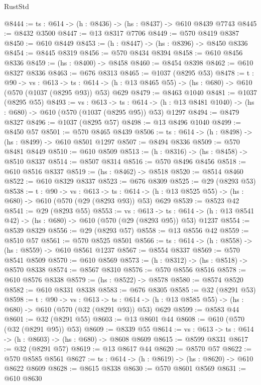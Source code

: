 \begin{lexlean}{RustStd}
\begin{coremodule}
@8444 := {ts : @614} -> (h : @8436) -> (hs : @8437) -> @610 @8439 @7743
@8445 := @8432 @3500
@8447 := @13 @8317 @7706
@8449 := @570 @8419 @8387
@8450 := @610 @8449
@8453 := (h : @8447) -> (hs : @8396) -> @8450 @8336
@8454 := @8445 @8319
@8456 := @570 @8434 @8394
@8458 := @610 @8456 @8336
@8459 := (hs : @8400) -> @8458
@8460 := @8454 @8398
@8462 := @610 @8327 @8336
@8463 := @676 @8313
@8465 := @1037 (@8295 @53)
@8478 := {t : @90} ->
  {vs : @613} ->
  {ts : @614} -> (h : @13 @8465 @55) -> (hs : @680) -> @610 (@570 (@1037 (@8295 @93)) @53) @629
@8479 := @8463 @1040
@8481 := @1037 (@8295 @55)
@8493 := {vs : @613} ->
  {ts : @614} -> (h : @13 @8481 @1040) -> (hs : @680) -> @610 (@570 (@1037 (@8295 @95)) @53) @1297
@8494 := @8479 @8327
@8496 := @1037 (@8295 @57)
@8498 := @13 @8496 @1040
@8499 := @8450 @57
@8501 := @570 @8465 @8439
@8506 := {ts : @614} -> (h : @8498) -> (hs : @8499) -> @610 @8501 @1297
@8507 := @8494 @8336
@8509 := @570 @8481 @8449
@8510 := @610 @8509
@8513 := (h : @8316) -> (hs : @8458) -> @8510 @8337
@8514 := @8507 @8314
@8516 := @570 @8496 @8456
@8518 := @610 @8516 @8337
@8519 := (hs : @8462) -> @8518
@8520 := @8514 @8460
@8522 := @610 @8329 @8337
@8523 := @676 @8309
@8525 := @29 (@8293 @53)
@8538 := {t : @90} ->
  {vs : @613} ->
  {ts : @614} -> (h : @13 @8525 @55) -> (hs : @680) -> @610 (@570 (@29 (@8293 @93)) @53) @629
@8539 := @8523 @42
@8541 := @29 (@8293 @55)
@8553 := {vs : @613} ->
  {ts : @614} -> (h : @13 @8541 @42) -> (hs : @680) -> @610 (@570 (@29 (@8293 @95)) @53) @1237
@8554 := @8539 @8329
@8556 := @29 (@8293 @57)
@8558 := @13 @8556 @42
@8559 := @8510 @57
@8561 := @570 @8525 @8501
@8566 := {ts : @614} -> (h : @8558) -> (hs : @8559) -> @610 @8561 @1237
@8567 := @8554 @8337
@8569 := @570 @8541 @8509
@8570 := @610 @8569
@8573 := (h : @8312) -> (hs : @8518) -> @8570 @8338
@8574 := @8567 @8310
@8576 := @570 @8556 @8516
@8578 := @610 @8576 @8338
@8579 := (hs : @8522) -> @8578
@8580 := @8574 @8520
@8582 := @610 @8331 @8338
@8583 := @676 @8305
@8585 := @32 (@8291 @53)
@8598 := {t : @90} ->
  {vs : @613} ->
  {ts : @614} -> (h : @13 @8585 @55) -> (hs : @680) -> @610 (@570 (@32 (@8291 @93)) @53) @629
@8599 := @8583 @44
@8601 := @32 (@8291 @55)
@8603 := @13 @8601 @44
@8608 := @610 (@570 (@32 (@8291 @95)) @53)
@8609 := @8339 @55
@8614 := {vs : @613} -> {ts : @614} -> (h : @8603) -> (hs : @680) -> @8608 @8609
@8615 := @8599 @8331
@8617 := @32 (@8291 @57)
@8619 := @13 @8617 @44
@8620 := @8570 @57
@8622 := @570 @8585 @8561
@8627 := {ts : @614} -> (h : @8619) -> (hs : @8620) -> @610 @8622 @8609
@8628 := @8615 @8338
@8630 := @570 @8601 @8569
@8631 := @610 @8630

\end{coremodule}
\end{lexlean}
